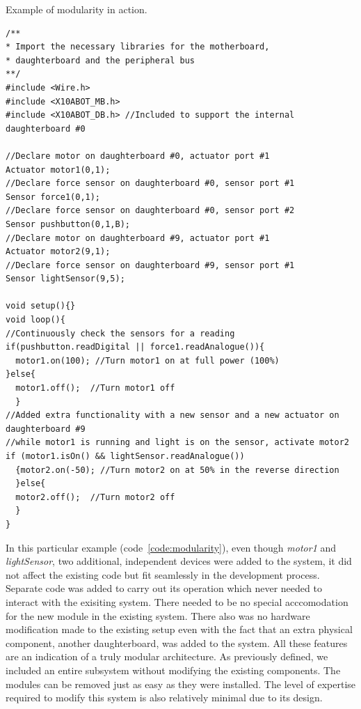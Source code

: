 \begin{listing}
		\footnotesize
		\caption{Example of modularity in action.} \label{code:modularity}
		\begin{verbatim}
/**
* Import the necessary libraries for the motherboard, 
* daughterboard and the peripheral bus
**/
#include <Wire.h>  
#include <X10ABOT_MB.h>
#include <X10ABOT_DB.h> //Included to support the internal daughterboard #0

//Declare motor on daughterboard #0, actuator port #1
Actuator motor1(0,1);
//Declare force sensor on daughterboard #0, sensor port #1
Sensor force1(0,1);
//Declare force sensor on daughterboard #0, sensor port #2
Sensor pushbutton(0,1,B);
//Declare motor on daughterboard #9, actuator port #1
Actuator motor2(9,1);
//Declare force sensor on daughterboard #9, sensor port #1
Sensor lightSensor(9,5);

void setup(){}
void loop(){
//Continuously check the sensors for a reading
if(pushbutton.readDigital || force1.readAnalogue()){
  motor1.on(100); //Turn motor1 on at full power (100%) 
}else{
  motor1.off();  //Turn motor1 off
  }
//Added extra functionality with a new sensor and a new actuator on daughterboard #9
//while motor1 is running and light is on the sensor, activate motor2
if (motor1.isOn() && lightSensor.readAnalogue())
  {motor2.on(-50); //Turn motor2 on at 50% in the reverse direction
  }else{
  motor2.off();  //Turn motor2 off
  }
}	 
	\end{verbatim}
		
\end{listing}
In this particular example (code~\ref{code:modularity}), even though \emph{motor1} and \emph{lightSensor}, two additional, independent devices were added to the system, it did not affect the existing code but fit seamlessly in the development process. Separate code was added to carry out its operation which never needed to interact with the exisiting system. There needed to be no special acccomodation for the new module in the existing system. There also was no hardware modification made to the existing setup even with the fact that an extra physical component, another daughterboard, was added to the system.
All these features are an indication of a truly modular architecture. As previously defined, we included an entire subsystem without modifying the existing components. The modules can be removed just as easy as they were installed. The level of expertise required to modify this system is also relatively minimal due to its design.


